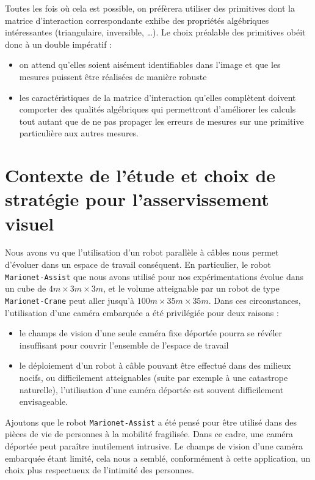 Toutes les fois où cela est possible, on préfèrera utiliser des primitives dont 
la matrice d'interaction correspondante exhibe des propriétés algébriques 
inté\-ressantes (triangulaire, inversible, \dots). Le choix préalable des 
primitives obéit donc à un double impératif :
\begin{itemize}
 \item on attend qu'elles soient aisément identifiables dans l'image et que les 
mesures puissent être réalisées de manière robuste
 \item les caractéristiques de la matrice d'interaction qu'elles complètent 
doivent comporter des qualités algébriques qui permettront d'améliorer les 
calculs tout autant que de ne pas propager les erreurs de mesures sur une 
primitive particulière aux autres mesures.
\end{itemize}


\section{Contexte de l'étude et choix de stratégie pour l'asser\-vissement 
visuel}\label{chap1-2}

Nous avons vu que l'utilisation d'un robot parallèle à câbles nous permet 
d'évoluer dans un espace de travail conséquent. En particulier, le robot {\tt 
Marionet-Assist} que nous avons utilisé pour nos expérimentations évolue dans 
un 
cube de $4m \times 3m \times 3m$, et le volume atteignable par un robot de type 
{\tt Marionet-Crane} peut aller jusqu'à $100m \times 35m \times 35m$. Dans ces 
circonstances, l'utilisation d'une caméra embarquée a été privilégiée pour deux 
raisons :
\begin{itemize}
 \item le champs de vision d'une seule caméra fixe déportée pourra se révéler 
insuffisant pour couvrir l'ensemble de l'espace de travail
 \item le déploiement d'un robot à câble pouvant être effectué dans des milieux 
nocifs, ou difficilement atteignables (suite par exemple à une catastrope 
naturelle), l'utilisation d'une caméra déportée est souvent difficilement 
envisageable.
\end{itemize}

Ajoutons que le robot {\tt Marionet-Assist} a été pensé pour être utilisé dans 
des pièces de vie de personnes à la mobilité fragilisée. Dans ce cadre, une 
caméra déportée peut paraître inutilement intrusive. Le champs de vision d'une 
caméra embarquée étant limité, cela nous a semblé, conformément à cette 
application, un choix plus respectueux de l'intimité des personnes. 

